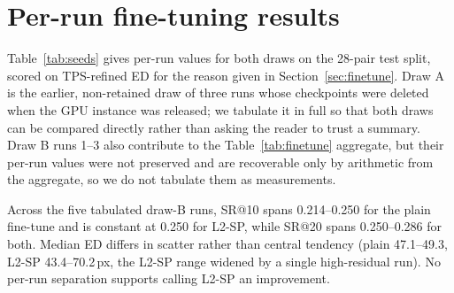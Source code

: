 \documentclass[10pt]{article}
\begin{document}
\section{Per-run fine-tuning results}
\label{app:runs}

Table~\ref{tab:seeds} gives per-run values for both draws on the 28-pair test split, scored on TPS-refined ED for the reason given in Section~\ref{sec:finetune}. Draw A is the earlier, non-retained draw of three runs whose checkpoints were deleted when the GPU instance was released; we tabulate it in full so that both draws can be compared directly rather than asking the reader to trust a summary. Draw B runs 1--3 also contribute to the Table~\ref{tab:finetune} aggregate, but their per-run values were not preserved and are recoverable only by arithmetic from the aggregate, so we do not tabulate them as measurements.

Across the five tabulated draw-B runs, SR@10 spans 0.214--0.250 for the plain fine-tune and is constant at 0.250 for L2-SP, while SR@20 spans 0.250--0.286 for both. Median ED differs in scatter rather than central tendency (plain 47.1--49.3, L2-SP 43.4--70.2\,px, the L2-SP range widened by a single high-residual run). No per-run separation supports calling L2-SP an improvement.
\end{document}

